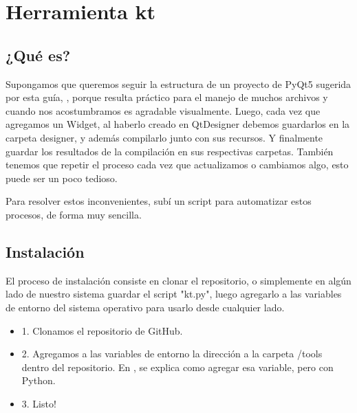 \section{Herramienta kt}

\subsection{¿Qu\'e es?}
Supongamos que queremos seguir la estructura de un proyecto de PyQt5 sugerida por esta gu\'ia, , porque resulta pr\'actico
para el manejo de muchos archivos y cuando nos acostumbramos es agradable visualmente. Luego, cada vez que agregamos un Widget, al haberlo creado en QtDesigner debemos
guardarlos en la carpeta designer, y adem\'as compilarlo junto con sus recursos. Y finalmente guardar los resultados de la compilaci\'on en sus respectivas carpetas.
Tambi\'en tenemos que repetir el proceso cada vez que actualizamos o cambiamos algo, esto puede ser un poco tedioso.

Para resolver estos inconvenientes, sub\'i un script para automatizar estos procesos, de forma muy sencilla.

\subsection{Instalaci\'on}
El proceso de instalaci\'on consiste en clonar el repositorio, o simplemente en alg\'un lado de nuestro sistema guardar el script "kt.py", luego
agregarlo a las variables de entorno del sistema operativo para usarlo desde cualquier lado.

\begin{itemize}
    \item 1. Clonamos el repositorio de GitHub.
    \item 2. Agregamos a las variables de entorno la direcci\'on a la carpeta /tools dentro del repositorio. En , se explica como agregar esa variable, pero con Python.
    \item 3. Listo!
\end{itemize}